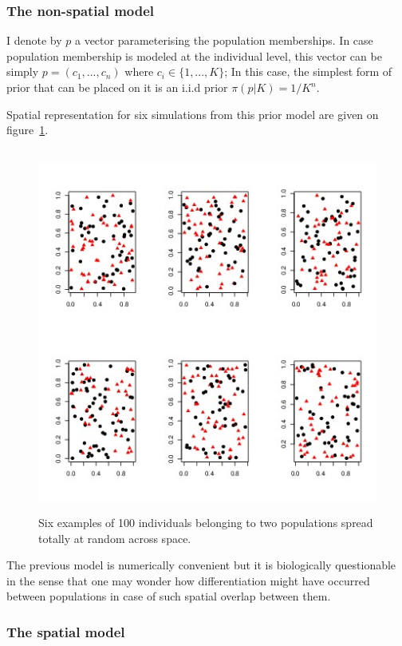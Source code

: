 \documentclass{article}
\begin{document}
\subsubsection{The non-spatial model}
I denote by  $p$ a vector parameterising the  population memberships. 
In case population membership is modeled at the individual level, this vector can be simply $p=(c_1,...,c_n)$ 
where $c_i \in \{1,...,K\}$; In this case, the simplest form of prior that can be placed on it is an i.i.d prior $\pi(p|K) = 1/K^n$. 

Spatial representation for six simulations from this prior model are given on figure~\ref{fig:nonspaprior}.

\begin{figure}[h]
\includegraphics[height=12cm,width=17cm]{../inst/images/example_spatial_bis.jpeg}
\caption{Six examples of 100 individuals belonging to two populations spread totally at random across space.}\label{fig:nonspaprior}
\end{figure}

The previous model is numerically convenient but it is biologically questionable in the sense that one may wonder how differentiation 
might have occurred between populations in case of such spatial overlap between them.

\subsubsection{The spatial model}
\end{document}
